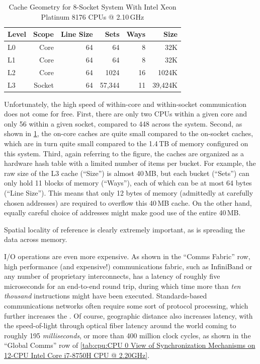 \begin{table}
\renewcommand*{\arraystretch}{1.1}
\centering\small
\begin{tabular}{lrrrrr}
	\toprule
	Level &  Scope & Line Size &   Sets & Ways &    Size \\
	\midrule
	L0    &   Core &        64 &     64 &    8 &     32K \\
	L1    &   Core &        64 &     64 &    8 &     32K \\
	L2    &   Core &        64 &   1024 &   16 &   1024K \\
	L3    & Socket &        64 & 57,344 &   11 & 39,424K \\
	\bottomrule
\end{tabular}
\caption{Cache Geometry for 8-Socket System With Intel Xeon Platinum 8176 CPUs @ 2.10\,GHz}
\label{tab:cpu:Cache Geometry for 8-Socket System With Intel Xeon Platinum 8176 CPUs @ 2.10GHz}
\end{table}

Unfortunately, the high speed of within-core and within-socket communication
does not come for free.
First, there are only two CPUs within a given core and only 56 within
a given socket, compared to 448 across the system.
Second, as shown in
\cref{tab:cpu:Cache Geometry for 8-Socket System With Intel Xeon Platinum 8176 CPUs @ 2.10GHz},
the on-core caches are quite small compared to the on-socket caches, which
are in turn quite small compared to the 1.4\,TB of memory configured on
this system.
Third, again referring to the figure, the caches are organized as
a hardware hash table with a limited number of items per bucket.
For example, the raw size of the L3 cache (``Size'') is almost 40\,MB, but each
bucket (``Sets'') can only hold 11 blocks of memory (``Ways''), each
of which can be at most 64 bytes (``Line Size'').
This means that only 12 bytes of memory (admittedly at carefully chosen
addresses) are required to overflow this 40\,MB cache.
On the other hand, equally careful choice of addresses might make good
use of the entire 40\,MB.

Spatial locality of reference is clearly extremely important, as is
spreading the data across memory.

I/O operations are even more expensive.
As shown in the ``Comms Fabric'' row,
high performance (and expensive!\@) communications fabric, such as
InfiniBand or any number of proprietary interconnects, has a latency
of roughly five microseconds for an end-to-end round trip, during which
time more than \emph{ten thousand} instructions might have been executed.
Standards-based communications networks often require some sort of
protocol processing, which further increases the .
Of course, geographic distance also increases latency, with the
speed-of-light through optical fiber latency around the world coming to
roughly 195 \emph{milliseconds}, or more than 400 million clock
cycles, as shown in the ``Global Comms'' row of
\cref{tab:cpu:CPU 0 View of Synchronization Mechanisms on 12-CPU Intel Core i7-8750H CPU @ 2.20GHz}.

